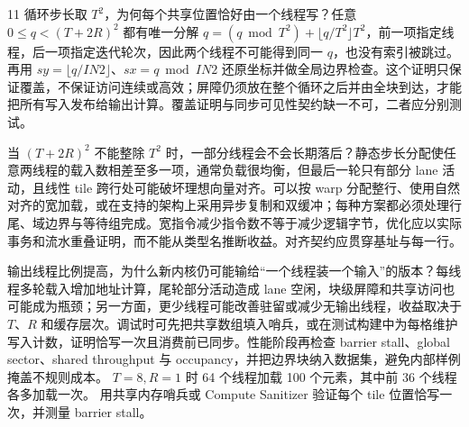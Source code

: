 \begin{solutionexercise}{11}
循环步长取 $T^2$，为何每个共享位置恰好由一个线程写？任意 $0\le q<(T+2R)^2$ 都有唯一分解 $q=(q\bmod T^2)+\lfloor q/T^2\rfloor T^2$，前一项指定线程，后一项指定迭代轮次，因此两个线程不可能得到同一 $q$，也没有索引被跳过。再用 $sy=\lfloor q/IN2\rfloor$、$sx=q\bmod IN2$ 还原坐标并做全局边界检查。这个证明只保证覆盖，不保证访问连续或高效；屏障仍须放在整个循环之后并由全块到达，才能把所有写入发布给输出计算。覆盖证明与同步可见性契约缺一不可，二者应分别测试。

当 $(T+2R)^2$ 不能整除 $T^2$ 时，一部分线程会不会长期落后？静态步长分配使任意两线程的载入数相差至多一项，通常负载很均衡，但最后一轮只有部分 lane 活动，且线性 tile 跨行处可能破坏理想向量对齐。可以按 warp 分配整行、使用自然对齐的宽加载，或在支持的架构上采用异步复制和双缓冲；每种方案都必须处理行尾、域边界与等待组完成。宽指令减少指令数不等于减少逻辑字节，优化应以实际事务和流水重叠证明，而不能从类型名推断收益。对齐契约应贯穿基址与每一行。

输出线程比例提高，为什么新内核仍可能输给“一个线程装一个输入”的版本？每线程多轮载入增加地址计算，尾轮部分活动造成 lane 空闲，块级屏障和共享访问也可能成为瓶颈；另一方面，更少线程可能改善驻留或减少无输出线程，收益取决于 $T$、$R$ 和缓存层次。调试时可先把共享数组填入哨兵，或在测试构建中为每格维护写入计数，证明恰写一次且消费前已同步。性能阶段再检查 barrier stall、global sector、shared throughput 与 occupancy，并把边界块纳入数据集，避免内部样例掩盖不规则成本。
\variantheading $T=8,R=1$ 时 64 个线程加载 100 个元素，其中前 36 个线程各多加载一次。
\practiceheading 用共享内存哨兵或 Compute Sanitizer 验证每个 tile 位置恰写一次，并测量 barrier stall。
\end{solutionexercise}
